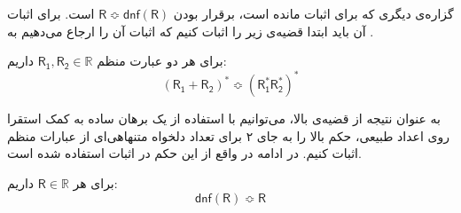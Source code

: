 گزاره‌ی دیگری که برای اثبات مانده است، برقرار بودن 
$\mathsf{R \Bumpeq dnf(R) }$
است. برای اثبات آن باید ابتدا قضیه‌ی زیر را اثبات کنیم که اثبات آن را ارجاع می‌دهیم به \cite{ullman}. 
\begin{thm}
	برای هر دو عبارت منظم 
	$\mathsf{R_1 , R_2} \in \mathbb{R}$
	داریم:
	$$\mathsf{(R_1 + R_2)^* \Bumpeq (R_1^* R_2^*)^*}$$
\end{thm} 

به عنوان نتیجه از قضیه‌ی بالا، می‌توانیم با استفاده از یک برهان ساده به کمک استقرا روی اعداد طبیعی، حکم بالا را به جای ۲ برای تعداد دلخواه متنهاهی‌ای از عبارات منظم اثبات کنیم. در ادامه در واقع از این حکم در اثبات استفاده شده است.

\begin{thm}
	برای هر
	$\mathsf{R} \in \mathbb{R}$ 
	داریم:
	$$\mathsf{dnf(R) \Bumpeq R}$$
\end{thm}

